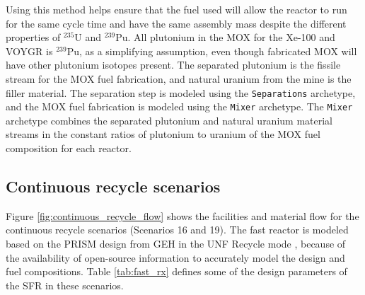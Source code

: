 Using this 
method helps ensure that the fuel used will allow the 
reactor to run for the same cycle time and have the same assembly mass 
despite the different properties of $^{235}$U and $^{239}$Pu.
All 
plutonium in the \gls{MOX} for the Xe-100 and VOYGR is $^{239}$Pu, as 
a simplifying assumption, even though 
fabricated \gls{MOX} will have other plutonium isotopes present.
The separated plutonium is the fissile stream for the \gls{MOX} 
fuel fabrication, and natural uranium from the mine is the filler 
material. The separation step is modeled using the \Cycamore 
\texttt{Separations} archetype, and the \gls{MOX} fuel fabrication is modeled 
using the \Cycamore \texttt{Mixer} archetype. The \texttt{Mixer} archetype 
combines the separated plutonium and natural uranium material 
streams in the constant ratios of plutonium to uranium of the 
\gls{MOX} fuel composition for each reactor. 

\subsection{Continuous recycle scenarios} \label{sec:continuous}
Figure \ref{fig:continuous_recycle_flow} shows the facilities and material 
flow for the continuous recycle scenarios (Scenarios 16 and 19). 
The fast reactor is modeled based on the PRISM design from 
\gls{GEH} in the \gls{UNF} Recycle mode \cite{triplett_prism:_2012}, 
because of 
the availability of open-source information to accurately model the design
and fuel compositions. Table \ref{tab:fast_rx} defines some of the 
design parameters of the \gls{SFR} in these scenarios.  




